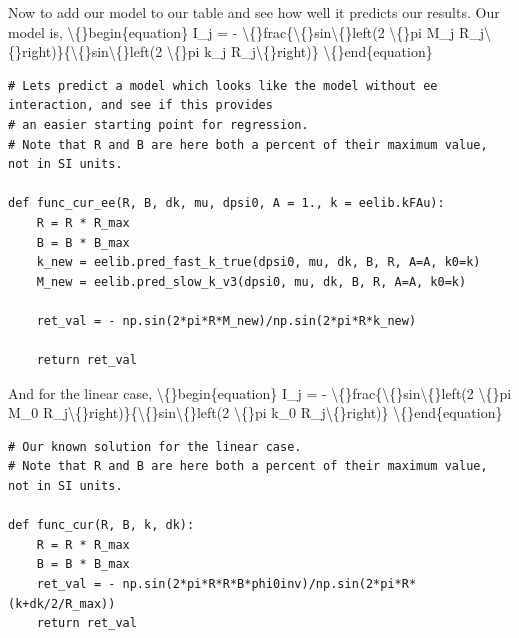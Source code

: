 \documentclass{article}
\begin{document}
Now to add our model to our table and see how well it predicts our results. Our model is,
\textbackslash\{\}begin\{equation\}
I\_j = - \textbackslash\{\}frac\{\textbackslash\{\}sin\textbackslash\{\}left(2 \textbackslash\{\}pi M\_j R\_j\textbackslash\{\}right)\}\{\textbackslash\{\}sin\textbackslash\{\}left(2 \textbackslash\{\}pi k\_j R\_j\textbackslash\{\}right)\}
\textbackslash\{\}end\{equation\}

\begin{lstlisting}
# Lets predict a model which looks like the model without ee interaction, and see if this provides
# an easier starting point for regression.
# Note that R and B are here both a percent of their maximum value, not in SI units.

def func_cur_ee(R, B, dk, mu, dpsi0, A = 1., k = eelib.kFAu):
    R = R * R_max
    B = B * B_max
    k_new = eelib.pred_fast_k_true(dpsi0, mu, dk, B, R, A=A, k0=k)
    M_new = eelib.pred_slow_k_v3(dpsi0, mu, dk, B, R, A=A, k0=k)
    
    ret_val = - np.sin(2*pi*R*M_new)/np.sin(2*pi*R*k_new)

    return ret_val\end{lstlisting}

And for the linear case, 
\textbackslash\{\}begin\{equation\}
I\_j = - \textbackslash\{\}frac\{\textbackslash\{\}sin\textbackslash\{\}left(2 \textbackslash\{\}pi M\_0 R\_j\textbackslash\{\}right)\}\{\textbackslash\{\}sin\textbackslash\{\}left(2 \textbackslash\{\}pi k\_0 R\_j\textbackslash\{\}right)\}
\textbackslash\{\}end\{equation\}

\begin{lstlisting}
# Our known solution for the linear case. 
# Note that R and B are here both a percent of their maximum value, not in SI units.

def func_cur(R, B, k, dk):
    R = R * R_max
    B = B * B_max
    ret_val = - np.sin(2*pi*R*R*B*phi0inv)/np.sin(2*pi*R*(k+dk/2/R_max))
    return ret_val\end{lstlisting}
\end{document}
